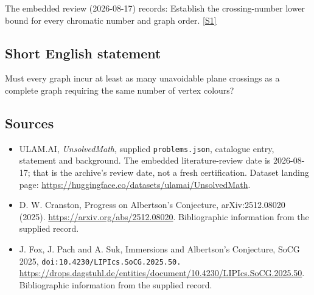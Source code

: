 \documentclass[11pt,a4paper]{article}
\newcommand{\sref}[2]{\hyperlink{source:#1:#2}{[S#2]}}
\begin{document}
The embedded review (2026-08-17) records: Establish the crossing-number lower bound for every chromatic number and graph order. \sref{statement}{1}

\subsection{Short English statement}

Must every graph incur at least as many unavoidable plane crossings as a complete graph requiring the same number of vertex colours?

\subsection{Sources}

{\small

\begin{itemize}

\item[\hypertarget{source:statement:1}{S1}] ULAM.AI, \emph{UnsolvedMath}, supplied \texttt{problems.json}, catalogue entry, statement and background. The embedded literature-review date is 2026-08-17; that is the archive’s review date, not a fresh certification. Dataset landing page: \url{https://huggingface.co/datasets/ulamai/UnsolvedMath}.

\item[\hypertarget{source:statement:2}{S2}] D. W. Cranston, Progress on Albertson's Conjecture, arXiv:2512.08020 (2025). \url{https://arxiv.org/abs/2512.08020}. Bibliographic information from the supplied record.

\item[\hypertarget{source:statement:3}{S3}] J. Fox, J. Pach and A. Suk, Immersions and Albertson's Conjecture, SoCG 2025, \nolinkurl{doi:10.4230/LIPIcs.SoCG.2025.50.} \url{https://drops.dagstuhl.de/entities/document/10.4230/LIPIcs.SoCG.2025.50}. Bibliographic information from the supplied record.

\end{itemize}

}

\label{end:statement}
\end{document}
